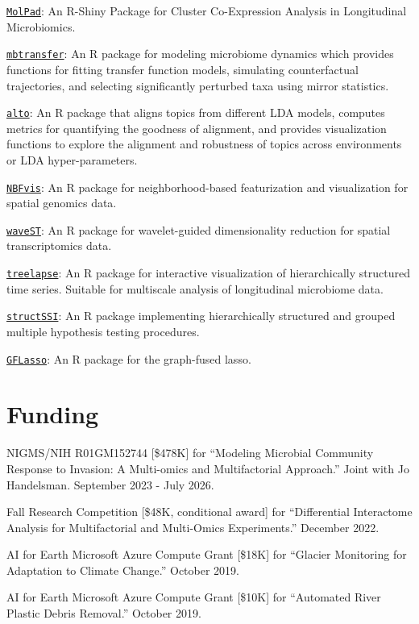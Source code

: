 \documentclass[letterpaper]{article}
\renewenvironment{itemize}{
  \begin{list}{}{
    \setlength{\leftmargin}{1.5em}
  }
}{
  \end{list}
}
\begin{document}
\begin{itemize}
\item \href{https://kaiyanm.github.io/MolPad/}{\texttt{MolPad}}: An R-Shiny Package for Cluster Co-Expression
Analysis in Longitudinal Microbiomics.
\item \href{https://krisrs1128.github.io/mbtransfer/}{\texttt{mbtransfer}}: An R
package for modeling microbiome dynamics which provides functions for fitting
transfer function models, simulating counterfactual trajectories, and selecting
significantly perturbed taxa using mirror statistics.
\item \href{https://lasy.github.io/alto/}{\texttt{alto}}: An R package that
aligns topics from different LDA models, computes metrics for quantifying the
goodness of alignment, and provides visualization functions to explore the
alignment and robustness of topics across environments or LDA hyper-parameters.
\item \href{https://github.com/XTH1114/NBFvis}{\texttt{NBFvis}}: An R package for neighborhood-based featurization and
visualization for spatial genomics data.
\item \href{https://github.com/OliverXUZY/waveST/}{\texttt{waveST}}: An R
package for wavelet-guided dimensionality reduction for spatial transcriptomics
data.
\item \href{https://krisrs1128.github.io/treelapse/}{\texttt{treelapse}}: An R
package for interactive visualization of hierarchically structured time series.
Suitable for multiscale analysis of longitudinal microbiome data.
\item \href{https://github.com/krisrs1128/structSSI}{\texttt{structSSI}}: An R
package implementing hierarchically structured and grouped multiple hypothesis
testing procedures.
\item \href{https://github.com/krisrs1128/GFLasso}{\texttt{GFLasso}}: An R
package for the graph-fused lasso.
\end{itemize}

\section*{Funding}

\begin{itemize}
\item NIGMS/NIH R01GM152744 [\$478K] for ``Modeling Microbial Community Response to Invasion: A Multi-omics and
Multifactorial Approach.'' Joint with Jo Handelsman. September 2023 - July 2026.
\item Fall Research Competition [\$48K, conditional award]
for ``Differential Interactome Analysis for Multifactorial and Multi-Omics
Experiments.'' December 2022.
\item AI for Earth Microsoft Azure Compute Grant [\$18K] for
``Glacier Monitoring for Adaptation to Climate Change.'' October 2019.
\item AI for Earth Microsoft Azure Compute Grant [\$10K] for
``Automated River Plastic Debris Removal.'' October 2019.
\end{itemize}
\end{document}
